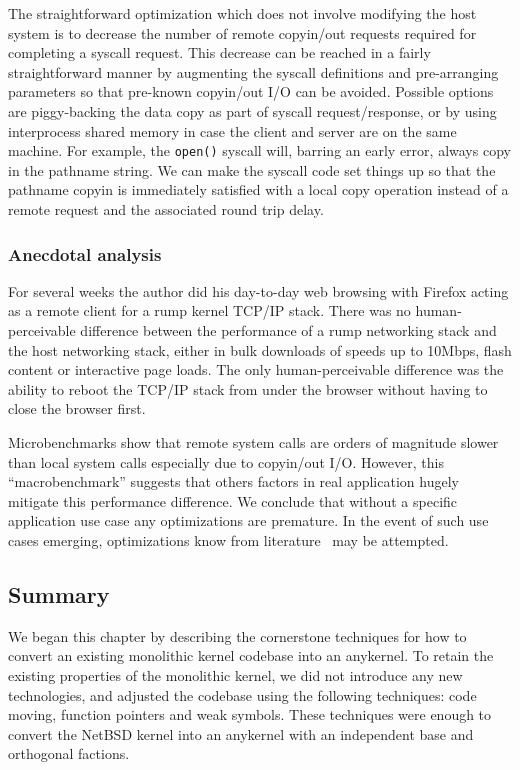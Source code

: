 The straightforward optimization which does not involve modifying
the host system is to decrease the number of remote copyin/out
requests required for completing a syscall request.  This decrease can be
reached in a fairly straightforward manner by augmenting the syscall
definitions and pre-arranging parameters so that pre-known copyin/out
I/O can be avoided.  Possible options are piggy-backing the data
copy as part of syscall request/response, or by using interprocess
shared memory in case the client and server are on the same
machine.  For example, the \verb+open()+ syscall will, barring an
early error, always copy in the pathname string.  We can make the
syscall code set things up so that the pathname copyin is immediately
satisfied with a local copy operation instead of a remote request
and the associated round trip delay.

\subsubsection*{Anecdotal analysis}

For several weeks the author did his day-to-day web browsing with
Firefox acting as a remote client for a rump kernel TCP/IP stack.
There was no human-perceivable difference between the performance
of a rump networking stack and the host networking stack, either
in bulk downloads of speeds up to 10Mbps, flash content or interactive
page loads.  The only human-perceivable difference was the ability
to reboot the TCP/IP stack from under the browser without having
to close the browser first.

Microbenchmarks show that remote system calls are orders of magnitude
slower than local system calls especially due to copyin/out I/O.
However, this ``macrobenchmark'' suggests that others factors in
real application hugely mitigate this performance difference.  We
conclude that without a specific application use case any optimizations
are premature.  In the event of such use cases emerging, optimizations
know from literature~\cite{bershad:lrpc, liedtke:improving} may be
attempted.

\subsection{Summary}

We began this chapter by describing the cornerstone techniques for
how to convert an existing monolithic kernel codebase into an
anykernel.  To retain the existing properties of the monolithic
kernel, we did not introduce any new technologies, and adjusted
the codebase using the following techniques: code moving, function
pointers and weak symbols.  These techniques were enough to convert
the NetBSD kernel into an anykernel with an independent base and
orthogonal factions.

